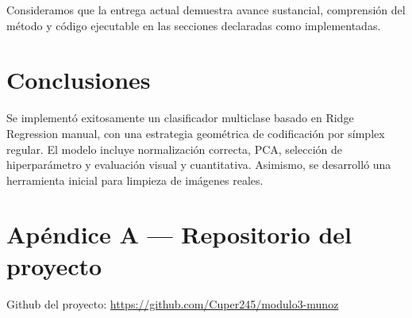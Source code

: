 \documentclass[12pt,a4paper]{article}
\begin{document}
Consideramos que la entrega actual demuestra avance sustancial, comprensión del método y código ejecutable en las secciones declaradas como implementadas.

\section{Conclusiones}
Se implementó exitosamente un clasificador multiclase basado en Ridge Regression manual, con una estrategia geométrica de codificación por símplex regular. El modelo incluye normalización correcta, PCA, selección de hiperparámetro y evaluación visual y cuantitativa. Asimismo, se desarrolló una herramienta inicial para limpieza de imágenes reales.


\section*{Apéndice A --- Repositorio del proyecto}
Github del proyecto: \url{https://github.com/Cuper245/modulo3-munoz}
\end{document}
